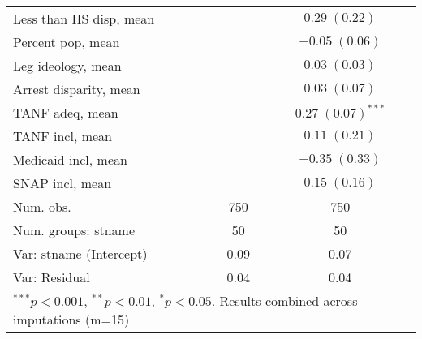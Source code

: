 \begin{table}
\begin{center}
\begin{tabular}{l c c }
Less than HS disp, mean    &                         & $0.29 \; (0.22)$       \\
Percent pop, mean          &                         & $-0.05 \; (0.06)$      \\
Leg ideology, mean         &                         & $0.03 \; (0.03)$       \\
Arrest disparity, mean     &                         & $0.03 \; (0.07)$       \\
TANF adeq, mean            &                         & $0.27 \; (0.07)^{***}$ \\
TANF incl, mean            &                         & $0.11 \; (0.21)$       \\
Medicaid incl, mean        &                         & $-0.35 \; (0.33)$      \\
SNAP incl, mean            &                         & $0.15 \; (0.16)$       \\
\hline
Num. obs.                  & 750                     & 750                    \\
Num. groups: stname        & 50                      & 50                     \\
Var: stname (Intercept)    & 0.09                    & 0.07                   \\
Var: Residual              & 0.04                    & 0.04                   \\
\hline
\multicolumn{3}{l}{\scriptsize{$^{***}p<0.001$, $^{**}p<0.01$, $^*p<0.05$. Results combined across imputations (m=15)}}
\end{tabular}
\label{table:coefficients}
\end{center}
\end{table}
